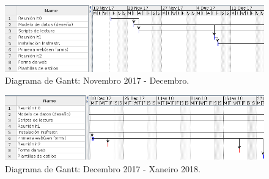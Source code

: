 \begin{figure}[H]
	\centering
	\includegraphics[scale=0.55,keepaspectratio=true]{./images/gantt/gantt1-1.png}
	\caption{Diagrama de Gantt: Novembro 2017 - Decembro.}
	\label{fig:gantt1-1}
\end{figure}

\begin{figure}[H]
	\centering
	\includegraphics[scale=0.5,keepaspectratio=true]{./images/gantt/gantt1-2.png}
	\caption{Diagrama de Gantt: Decembro 2017 - Xaneiro 2018.}
	\label{fig:gantt1-2}
\end{figure}

